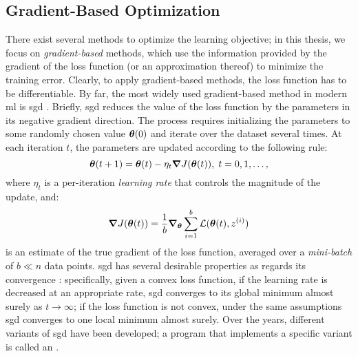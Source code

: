 \subsection{Gradient-Based Optimization}
There exist several methods to optimize the learning objective; in this thesis, we focus on \emph{gradient-based} methods, which use the information provided by the gradient of the loss function (or an approximation thereof) to minimize the training error. Clearly, to apply gradient-based methods, the loss function has to be differentiable. By far, the most widely used gradient-based method in modern \gls{ml} is \gls{sgd} \citep{ruder2016overviewsgd}. Briefly, \gls{sgd} reduces the value of the loss function by  the parameters in its negative gradient direction. The process requires initializing the parameters to some randomly chosen value $\boldsymbol{\theta}(0)$ and iterate over the dataset several times. At each iteration $t$, the parameters are updated according to the following rule:
$$ \boldsymbol{\theta}(t+1) = \boldsymbol{\theta}(t) - \eta_t \grad J(\boldsymbol{\theta}(t)),\; t= 0, 1, \ldots,$$
where $\eta_t$ is a per-iteration \emph{learning rate} that controls the magnitude of the update, and:
$$ \grad J(\boldsymbol{\theta}(t)) = \frac{1}{b} \grad_{\boldsymbol{\theta}}  \sum_{i=1}^{b} \mathcal{L}(\boldsymbol{\theta}(t), z^{(i)})$$
is an estimate of the true gradient of the loss function, averaged over a \emph{mini-batch} of $b \ll n$ data points. \gls{sgd} has several desirable properties as regards its convergence \citep{robbins1951stochastic}: specifically, given a convex loss function, if the learning rate is decreased at an appropriate rate, \gls{sgd} converges to its global minimum almost surely as $t \to \infty$; if the loss function is not convex, under the same assumptions \gls{sgd} converges to one local minimum almost surely. Over the years, different variants of \gls{sgd} have been developed; a program that implements a specific variant is called an .

